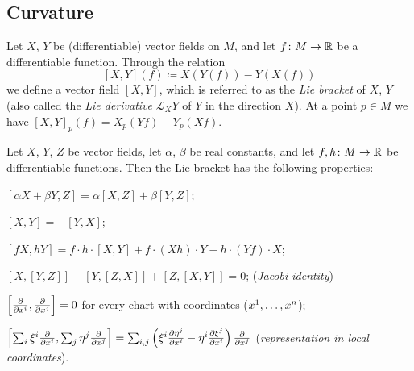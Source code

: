 \documentclass[../main.tex]{subfiles}
\begin{document}
\subsection{Curvature}
\begin{definition}\label{Manifold:LieBracket}
Let \(X\), \(Y\) be (differentiable) vector fields on \(M\),
and let \(f\colon M\to\mathbb{R}\) be a differentiable function.
Through the relation
\[
\left[X,Y\right]\left(f\right)
\coloneqq
X\left(Y\left(f\right)\right)
- Y\left(X\left(f\right)\right)
\]
we define a vector field \(\left[X,Y\right]\),
which is referred to as the \textit{Lie bracket} of \(X\), \(Y\)
(also called the \textit{Lie derivative} \(\mathcal{L}_XY\) of \(Y\) in the direction \(X\)).
At a point \(p\in M\) we have \(\left[X,Y\right]_p\left(f\right)=X_p\left(Yf\right)-Y_p\left(Xf\right)\).
\end{definition}
\begin{lemma}\label{Manifold:LieBracket:Property}
Let \(X\), \(Y\), \(Z\) be vector fields,
let \(\alpha\), \(\beta\) be real constants,
and let \(f, h\colon M\to\mathbb{R}\) be differentiable functions.
Then the Lie bracket has the following properties:
\begin{APAenumerate}
\item \(\left[\alpha X+\beta Y, Z\right]=\alpha\left[X,Z\right]+\beta\left[Y,Z\right]\);
\item \(\left[X,Y\right]=-\left[Y,X\right]\);
\item \(\left[fX,hY\right]=f\cdot h\cdot\left[X,Y\right]+f\cdot\left(Xh\right)\cdot Y-h\cdot\left(Yf\right)\cdot X\);
\item \(\left[X,\left[Y,Z\right]\right]+\left[Y,\left[Z,X\right]\right]+\left[Z,\left[X,Y\right]\right] = 0\); (\textit{Jacobi identity})
\item \(\left[\frac{\partial}{\partial\tensor{x}{^i}}, \frac{\partial}{\partial\tensor{x}{^j}}\right]=0\) for every chart with coordinates (\(\tensor{x}{^1},\dots,\tensor{x}{^n}\));
\item \(\left[\sum_i\tensor{\xi}{^i}\frac{\partial}{\partial\tensor{x}{^i}},\sum_j\tensor{\eta}{^j}\frac{\partial}{\partial\tensor{x}{^j}}\right]=\sum_{i,j}\left(\tensor{\xi}{^i}\frac{\partial\tensor{\eta}{^j}}{\partial\tensor{x}{^i}}-\tensor{\eta}{^i}\frac{\partial\tensor{\xi}{^j}}{\partial\tensor{x}{^i}}\right)\frac{\partial}{\partial\tensor{x}{^j}}\) (\textit{representation in local coordinates}).
\end{APAenumerate}
\end{lemma}
\end{document}

